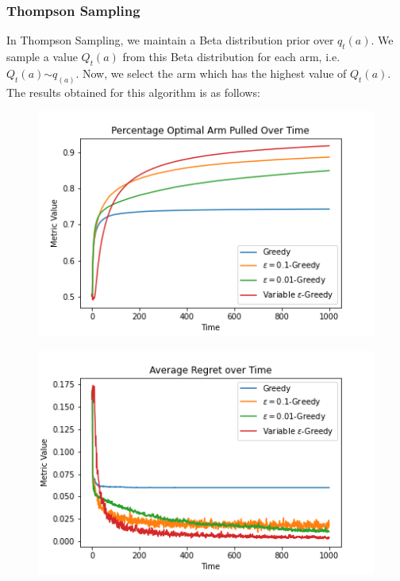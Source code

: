 \documentclass{article}
\begin{document}
		\subsubsection{Thompson Sampling}
		In Thompson Sampling, we maintain a Beta distribution prior over $q_{t}(a)$. We sample a value $Q_{t}(a)$ from this Beta distribution for each arm, i.e.
		$Q_{t}(a) \stackrel{}{\sim} q_(a)$. Now, we select the arm which has the highest value of $Q_{t}(a)$. The results obtained for this algorithm is as 
		follows:
		
		\begin{figure}[H]
		\graphicspath{ {../Experiments/Bernoulli_2_Thompson_Sampling/} }
		\centering
		\begin{minipage}{.5\textwidth}
		  \centering
		  \includegraphics[width=\linewidth]{Percentage_Optimal_Arm_Pulled_Over_Time.png}
		  \label{fig:test1}
		\end{minipage}%
		\begin{minipage}{.5\textwidth}
		  \centering
		  \includegraphics[width=\linewidth]{Average_Regret_over_Time.png}
		  \label{fig:test2}
		\end{minipage}
		\end{figure}
		
\end{document}
